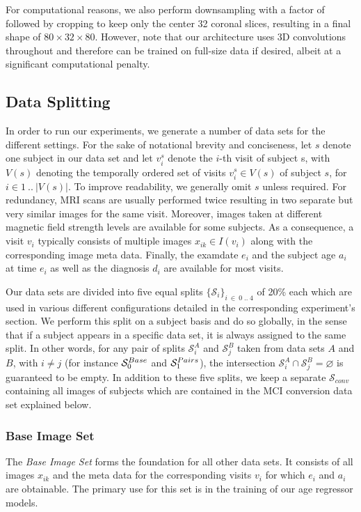 For computational reasons, we also perform downsampling with a factor of  followed by cropping to keep only the center 32 coronal slices, resulting in a final shape of $ 80 \times 32 \times 80 $. However, note that our architecture uses 3D convolutions throughout and therefore can be trained on full-size data if desired, albeit at a significant computational penalty.

\subsection{Data Splitting}
\label{sec:datsplitting}
In order to run our experiments, we generate a number of data sets for the different settings. For the sake of notational brevity and conciseness, let $s$ denote one subject in our data set and let $v^s_i$ denote the $i$-th visit of subject s, with $V(s)$ denoting the temporally ordered set of visits $v^s_i \in V(s)$ of subject $s$, for $i \in 1 \ ..\ |V(s)|$. To improve readability, we generally omit $s$ unless required. For redundancy, MRI scans are usually performed twice resulting in two separate but very similar images for the same visit. Moreover, images taken at different magnetic field strength levels are available for some subjects. As a consequence, a visit $v_i$ typically consists of multiple images $x_{ik} \in I(v_i)$ along with the corresponding image meta data. Finally, the examdate $e_i$ and the subject age $a_i$ at time $e_i$ as well as the diagnosis $d_i$ are available for most visits.

Our data sets are divided into five equal splits $ \{ \mathcal{S}_i \}_{i\ \in\ 0\;..\;4} $ of 20\% each which are used in various different configurations detailed in the corresponding experiment's section. We perform this split on a subject basis and do so globally, in the sense that if a subject appears in a specific data set, it is always assigned to the same split. In other words, for any pair of splits $ \mathcal{S}_i^A $ and $ \mathcal{S}_j^B $ taken from data sets $A$ and $B$, with $ i \neq j $ (for instance $\mathcal{S}^{\scaleto{Base}{5pt}}_0$ and $\mathcal{S}^{\scaleto{Pairs}{5pt}}_1$), the intersection $ { \mathcal{S}_i^A \cap \mathcal{S}_j^B = \varnothing } $ is guaranteed to be empty. In addition to these five splits, we keep a separate $\mathcal{S}_{conv}$ containing all images of subjects which are contained in the MCI conversion data set explained below.

\subsubsection*{Base Image Set} \label{sec:datsingles}
The \textit{Base Image Set} forms the foundation for all other data sets. It consists of all images $x_{ik}$ and the meta data for the corresponding visits $v_i$ for which $e_i$ and $a_i$ are obtainable. The primary use for this set is in the training of our age regressor models.

